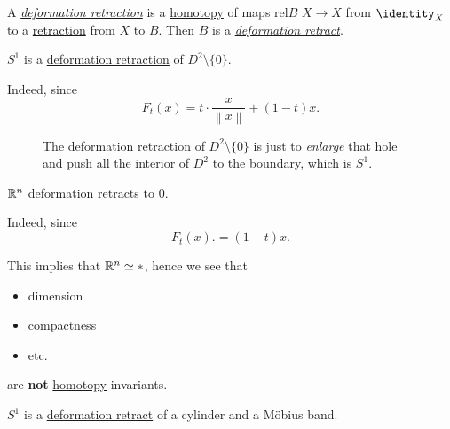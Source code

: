 \begin{prev}
	A \hyperref[def:deformation-retraction]{\emph{deformation retraction}} is a \hyperref[def:homotopy]{homotopy}
	of maps \(\mathrm{rel} B\) \(X\to X\) from \(\identity_X\) to a \hyperref[def:retraction]{retraction} from \(X\) to \(B\). Then \(B\) is a
	\hyperref[def:deformation-retraction]{\emph{deformation retract}}.
\end{prev}

\begin{eg}
	\(S^1\) is a \hyperref[def:deformation-retraction]{deformation retraction} of \(D^{2}\setminus \{0\}\).
\end{eg}
\begin{explanation}
	Indeed, since
	\[
		F_t(x) = t\cdot \frac{x}{\left\lVert x\right\rVert } + (1 - t)x.
	\]
	\begin{figure}[H]
		\centering
		\caption{The \hyperref[def:deformation-retraction]{deformation retraction} of \(D^{2}\setminus \{0\}\) is just to
			\emph{enlarge} that hole and push all the interior of \(D^2\) to the boundary, which is \(S^1\).}
		\label{fig:eg:punched-circle}
	\end{figure}
\end{explanation}
\begin{eg}
	\(\mathbb{\MakeUppercase{R}} ^n\) \hyperref[def:deformation-retraction]{deformation retracts} to \(0\).
\end{eg}
\begin{explanation}
	Indeed, since
	\[
		F_t(x). = (1 - t)x.
	\]
	\begin{remark}
		This implies that \(\mathbb{\MakeUppercase{R}} ^n\simeq *\), hence we see that
		\begin{itemize}
			\item dimension
			\item compactness
			\item etc.
		\end{itemize}
		are \textbf{not} \hyperref[def:homotopy]{homotopy} invariants.
	\end{remark}
\end{explanation}
\begin{eg}
	\(S^1\) is a \hyperref[def:deformation-retraction]{deformation retract} of a cylinder and a Möbius band.
\end{eg}
